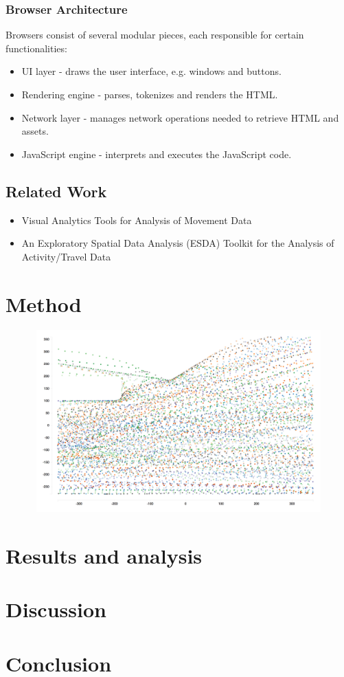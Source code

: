 \documentclass{article}
\begin{document}
\subsubsection{Browser Architecture}

Browsers consist of several modular pieces, each responsible for certain functionalities:
\begin{itemize}
    \item UI layer - draws the user interface, e.g. windows and buttons. 
    \item Rendering engine - parses, tokenizes and renders the HTML. 
    \item Network layer - manages network operations needed to retrieve HTML and assets.
    \item JavaScript engine - interprets and executes the JavaScript code. 
\end{itemize}


\subsection{Related Work}
 \begin{itemize}
     \item Visual Analytics Tools for Analysis of Movement Data
     \item An Exploratory Spatial Data Analysis (ESDA) Toolkit for the Analysis of Activity/Travel Data
 \end{itemize}

\section{Method}

\includegraphics[height= 7cm, width=14cm]{scatterplot.png}




\section{Results and analysis}

\section{Discussion}

\section{Conclusion}

\printbibliography
\end{document}

